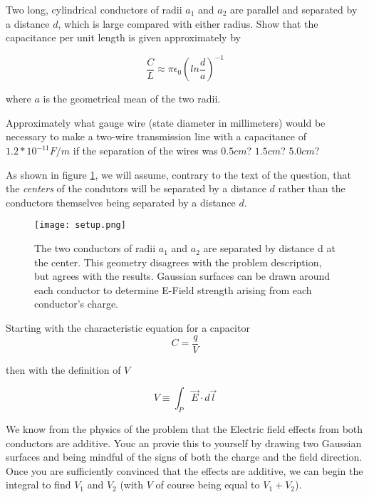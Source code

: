 
\begin{question}
Two long, cylindrical conductors of radii $a_1$ and $a_2$ are parallel
and separated by a distance $d$, which is large compared with either
radius. Show that the capacitance per unit length is given
approximately by

\begin{equation}
  \frac C L \approx \pi \epsilon_0 \left( ln \frac d a \right)^{-1}
\end{equation}


where $a$ is the geometrical mean of the two radii.

Approximately what gauge wire (state diameter in millimeters) would be
necessary to make a two-wire transmission line with a capacitance of
$1.2 * 10^{-11} F/m$ if the separation of the wires was $0.5 cm$? $1.5
cm$? $5.0 cm$?
\end{question}

As shown in figure \ref{fig::1::7::setup}, we will assume, contrary to
the text of the question, that the \emph{centers} of the condutors
will be separated by a distance $d$ rather than the conductors
themselves being separated by a distance $d$.

\begin{figure}[h]
  \begin{center}

    \texttt{[image: setup.png]}

    \caption{The two conductors of radii $a_1$ and $a_2$ are separated by
      distance d at the center.  This geometry disagrees with the
      problem description, but agrees with the results.  Gaussian
      surfaces can be drawn around each conductor to determine E-Field
      strength arising from each conductor's charge.}

    \label{fig::1::7::setup}

  \end{center}
\end{figure}

Starting with the characteristic equation for a capacitor
\begin{equation}
  C = \frac q V
\end{equation}

then with the definition of $V$

\begin{equation}
    V \equiv \int_P \vec{E} \cdot d\vec{l}
\end{equation}

We know from the physics of the problem that the Electric field
effects from both conductors are additive.  Youc an provie this to
yourself by drawing two Gaussian surfaces and being mindful of the
signs of both the charge and the field direction.  Once you are
sufficiently convinced that the effects are additive, we can begin the
integral to find $V_1$ and $V_2$ (with $V$ of course being equal to
$V_1 + V_2$).


